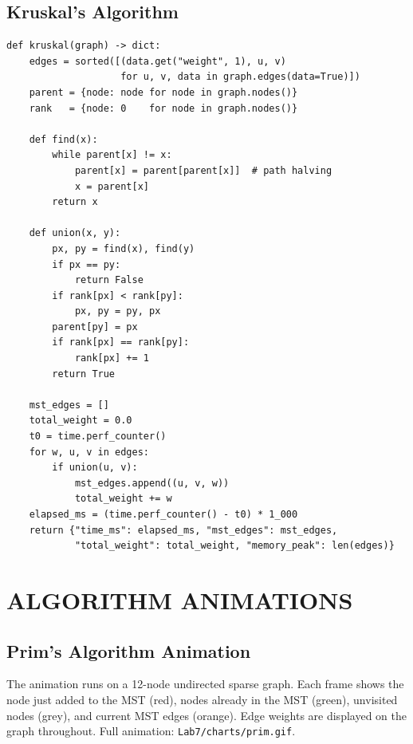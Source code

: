 \documentclass[12pt]{article}
\begin{document}
\subsection*{Kruskal's Algorithm}

\begin{lstlisting}[caption={Kruskal's algorithm with Union-Find}, label={lst:kruskal}]
def kruskal(graph) -> dict:
    edges = sorted([(data.get("weight", 1), u, v)
                    for u, v, data in graph.edges(data=True)])
    parent = {node: node for node in graph.nodes()}
    rank   = {node: 0    for node in graph.nodes()}

    def find(x):
        while parent[x] != x:
            parent[x] = parent[parent[x]]  # path halving
            x = parent[x]
        return x

    def union(x, y):
        px, py = find(x), find(y)
        if px == py:
            return False
        if rank[px] < rank[py]:
            px, py = py, px
        parent[py] = px
        if rank[px] == rank[py]:
            rank[px] += 1
        return True

    mst_edges = []
    total_weight = 0.0
    t0 = time.perf_counter()
    for w, u, v in edges:
        if union(u, v):
            mst_edges.append((u, v, w))
            total_weight += w
    elapsed_ms = (time.perf_counter() - t0) * 1_000
    return {"time_ms": elapsed_ms, "mst_edges": mst_edges,
            "total_weight": total_weight, "memory_peak": len(edges)}
\end{lstlisting}

\section*{ALGORITHM ANIMATIONS}

\subsection*{Prim's Algorithm Animation}

\hspace{0.8cm} The animation runs on a 12-node undirected sparse graph.
Each frame shows the node just added to the MST (red), nodes already in the
MST (green), unvisited nodes (grey), and current MST edges (orange).
Edge weights are displayed on the graph throughout.
Full animation: \texttt{Lab7/charts/prim.gif}.
\end{document}
